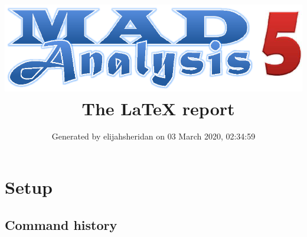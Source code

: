 \documentclass[a4paper, 10pt]{article}
\title{{\includegraphics[scale=.4]{logo.eps}}\ The LaTeX report}
\author{Generated by elijahsheridan on 03 March 2020, 02:34:59}
\begin{document}
\maketitle
\flushbottom

\newpage
\section{ Setup}

\subsection{ Command history}
\end{document}
